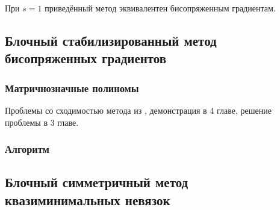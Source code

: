 При $s=1$ приведённый метод эквивалентен бисопряженным градиентам. 

\subsection[Блочный стабилизированный метод бисопряженных градиентов]{Блочный стабилизированный метод бисопряженных градиентов \cite{elGuennouni2003}}

\subsubsection{Матричнозначные полиномы}
 \par Проблемы со сходимостью метода из \cite{elGuennouni2003}, демонстрация в 4 главе, решение проблемы в 3 главе.
 \subsubsection{Алгоритм}
 \subsection[Блочный симметричный метод квазиминимальных невязок]{Блочный симметричный метод квазиминимальных невязок \cite{doi:10.1137/0917019}}


\newpage
